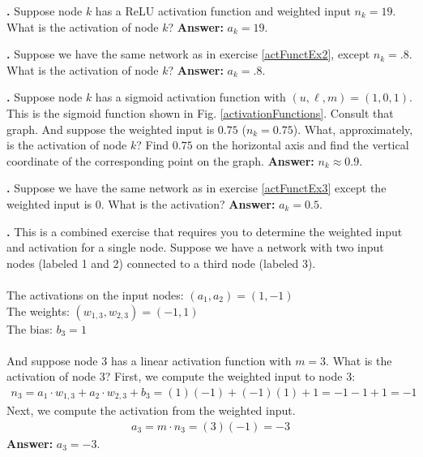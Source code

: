 \bigskip


\label{actFunctEx2}
\noindent
{\bf \theActFunctionCounter.} Suppose node $k$ has a ReLU activation function and weighted input $n_k = 19$. What is the activation of node $k$? {\bf 
Answer:} $a_k = 19$.

\bigskip

\noindent
{\bf \theActFunctionCounter.} Suppose we have the same network as in exercise \ref{actFunctEx2}, except $n_k = .8$. What is the activation of node $k$? {\bf Answer:} $a_k = .8$.

\bigskip

\label{actFunctEx3}
\noindent
{\bf \theActFunctionCounter.} Suppose node $k$ has a sigmoid activation function
with $(u,\ell,m) = (1,0,1)$. This is the sigmoid function shown in Fig. 
\ref{activationFunctions}. Consult that graph. And suppose the weighted input is 
$0.75$ ($n_k = 0.75$). What, approximately, is the activation of node $k$?  
Find $0.75$ on the horizontal axis and find the vertical coordinate of the 
corresponding point on the graph. {\bf Answer:} $n_k \approx 0.9$.

\bigskip

\noindent
{\bf \theActFunctionCounter.} Suppose we have the same network as in exercise \ref{actFunctEx3} except the weighted input is $0$. What is the activation?  {\bf Answer:} $a_k = 0.5$. 

\bigskip

\label{actFunctEx4}
\noindent
{\bf \theActFunctionCounter.} This is a combined exercise that requires you to determine 
the weighted input and activation for a single node. Suppose we have a network with 
two input nodes (labeled 1 and 2) connected to a third node (labeled 3). \\ \\
\indent \qquad\qquad The activations on the input nodes: $(a_1,a_2) = (1,-1)$\\
\indent \qquad\qquad The weights: $(w_{1,3}, w_{2,3}) = (-1,1)$ \\
\indent \qquad\qquad The bias: $b_3 = 1$ \\ \\
And suppose node 3 has a linear activation function with $m=3$. What is the 
activation of node 3?  First, we compute the weighted input to node 3:
\begin{eqnarray*}
n_3 = a_1 \cdot w_{1,3}  + a_2 \cdot w_{2,3} + b_{3} 
    =     (1)(-1)        +     (-1)(1)       + 1     
    = -1 -1 + 1 = -1
\end{eqnarray*}
Next, we compute the activation from the weighted input.
\begin{eqnarray*}
a_3 = m \cdot n_3  = (3)(-1) = -3
\end{eqnarray*}
{\bf Answer:}  $a_3=-3$.

